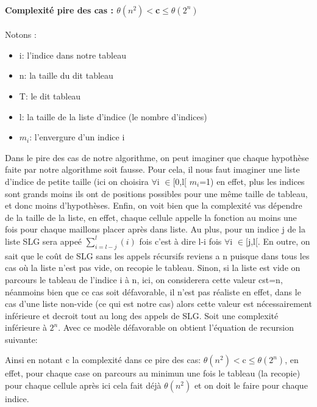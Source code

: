 \documentclass{article}
\begin{document}
\paragraph{Complexité pire des cas : $\theta(n^2) <$c$\leq\theta(2^n)$\\ }
 Notons :
\begin{itemize}
\item i: l'indice dans notre tableau
\item n: la taille du dit tableau
\item T: le dit tableau
\item l: la taille de la liste d'indice (le nombre d'indices)
\item $m_i$: l'envergure d'un indice i
\end{itemize}
Dans le pire des cas de notre algorithme, on peut imaginer que chaque hypothèse faite par notre algorithme soit fausse. Pour cela, il nous faut imaginer une liste d'indice de petite taille (ici on choisira $\forall$i $\in$[0,l[ $m_i$=1) en effet, plus les indices sont grands moins ils ont de positions possibles pour une même taille de tableau, et donc moins d'hypothèses.
\newline Enfin, on voit bien que la complexité vas dépendre de la taille de la liste, en effet, chaque cellule appelle la fonction au moins une fois pour chaque maillons placer après dans liste. Au plus, pour un indice j de la liste SLG sera appeé $\sum_{i=l-j}^{l} (i)$ fois c'est à dire l-i fois $\forall$i $\in$[j,l[.
\newline En outre, on sait que le coût de SLG sans les appels récursifs reviens a n puisque dans tous les cas où la liste n'est pas vide, on recopie le tableau. Sinon, si la liste est vide on parcours le tableau de l'indice i à n, ici, on considerera cette valeur cst=n, néanmoins bien que ce cas soit défavorable, il n'est pas réaliste en effet, dans le cas d'une liste non-vide (ce qui est notre cas) alors cette valeur est nécessairement inférieure et decroit tout au long des appels de SLG.
Soit une complexité inférieure à $2^n$.
\newline
Avec ce modèle défavorable on obtient l'équation de recursion suivante:
\begin{center}
\end{center}
Ainsi en notant c la complexité dans ce pire des cas: $\theta(n^2) <$c$\leq\theta(2^n)$, en effet, pour chaque case on parcours au minimun une fois le tableau (la recopie) pour chaque cellule après ici cela fait déjà $\theta(n^2)$ et on doit le faire pour chaque indice.
\end{document}
